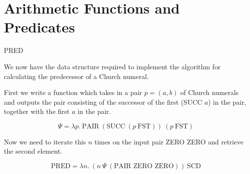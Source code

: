 \documentclass{beamer}
\begin{document}

    
    
    
    
    
    
    
    

\section{Arithmetic Functions and Predicates}

\begin{frame}{PRED}
    
    We now have the data structure required to implement the algorithm for calculating the predecessor of a Church numeral. 
    
    \vspace{0.5cm}
    
    First we write a function which takes in a pair $p = (a,b)$ of Church numerals and outputs the pair consisting of the successor of the first (SUCC $a$) in the pair, together with the first $a$ in the pair.
    
    $$ \Psi = \lambda p. \ \text{PAIR} \ (\text{SUCC} \ (p \ \text{FST})) \ (p \ \text{FST}) $$
    
    Now we need to iterate this $n$ times on the input pair ZERO ZERO and retrieve the second element.
    
    $$\text{PRED} = \lambda n. \ (n \ \Psi \ (\text{PAIR ZERO ZERO})) \ \text{SCD}$$
    
    
\end{frame}
\end{document}
